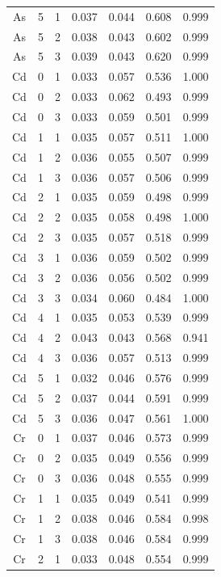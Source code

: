 \documentclass[ms, hidelinks]{uncgdissertationexp3}
\theoremstyle{plain}
\theoremstyle{definition}
\theoremstyle{remark}
\begin{document}
\begin{longtable}{ccccccc}
  As & 5 & 1 & 0.037 & 0.044 & 0.608 & 0.999\\
  \rowcolor{gray!6}  As & 5 & 2 & 0.038 & 0.043 & 0.602 & 0.999\\
  As & 5 & 3 & 0.039 & 0.043 & 0.620 & 0.999\\
  \rowcolor{gray!6}  Cd & 0 & 1 & 0.033 & 0.057 & 0.536 & 1.000\\
  Cd & 0 & 2 & 0.033 & 0.062 & 0.493 & 0.999\\
  \rowcolor{gray!6}  Cd & 0 & 3 & 0.033 & 0.059 & 0.501 & 0.999\\
  Cd & 1 & 1 & 0.035 & 0.057 & 0.511 & 1.000\\
  \rowcolor{gray!6}  Cd & 1 & 2 & 0.036 & 0.055 & 0.507 & 0.999\\
  Cd & 1 & 3 & 0.036 & 0.057 & 0.506 & 0.999\\
  \rowcolor{gray!6}  Cd & 2 & 1 & 0.035 & 0.059 & 0.498 & 0.999\\
  Cd & 2 & 2 & 0.035 & 0.058 & 0.498 & 1.000\\
  \rowcolor{gray!6}  Cd & 2 & 3 & 0.035 & 0.057 & 0.518 & 0.999\\
  Cd & 3 & 1 & 0.036 & 0.059 & 0.502 & 0.999\\
  \rowcolor{gray!6}  Cd & 3 & 2 & 0.036 & 0.056 & 0.502 & 0.999\\
  Cd & 3 & 3 & 0.034 & 0.060 & 0.484 & 1.000\\
  \rowcolor{gray!6}  Cd & 4 & 1 & 0.035 & 0.053 & 0.539 & 0.999\\
  Cd & 4 & 2 & 0.043 & 0.043 & 0.568 & 0.941\\
  \rowcolor{gray!6}  Cd & 4 & 3 & 0.036 & 0.057 & 0.513 & 0.999\\
  Cd & 5 & 1 & 0.032 & 0.046 & 0.576 & 0.999\\
  \rowcolor{gray!6}  Cd & 5 & 2 & 0.037 & 0.044 & 0.591 & 0.999\\
  Cd & 5 & 3 & 0.036 & 0.047 & 0.561 & 1.000\\
  \rowcolor{gray!6}  Cr & 0 & 1 & 0.037 & 0.046 & 0.573 & 0.999\\
  Cr & 0 & 2 & 0.035 & 0.049 & 0.556 & 0.999\\
  \rowcolor{gray!6}  Cr & 0 & 3 & 0.036 & 0.048 & 0.555 & 0.999\\
  Cr & 1 & 1 & 0.035 & 0.049 & 0.541 & 0.999\\
  \rowcolor{gray!6}  Cr & 1 & 2 & 0.038 & 0.046 & 0.584 & 0.998\\
  Cr & 1 & 3 & 0.038 & 0.046 & 0.584 & 0.999\\
  \rowcolor{gray!6}  Cr & 2 & 1 & 0.033 & 0.048 & 0.554 & 0.999\\

\end{longtable}
\end{document}
